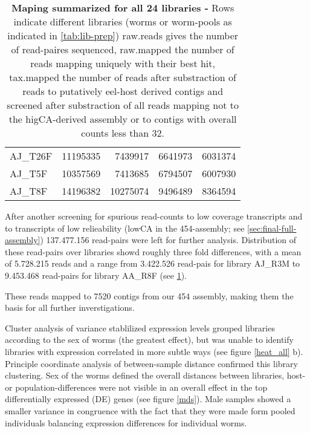 \begin{table}[h]
\begin{center}
\begin{tabular}{llrrr}
  AJ\_T26F & 11195335 & 7439917 & 6641973 & 6031374 \\ 
  AJ\_T5F & 10357569 & 7413685 & 6794507 & 6007930 \\ 
  AJ\_T8F & 14196382 & 10275074 & 9496489 & 8364594 \\ 
   \hline
\end{tabular}
\caption[mapping Summary]{\textbf{Maping summarized for all 24
    libraries -} Rows indicate different libraries (worms or
  worm-pools as indicated in \ref{tab:lib-prep}) raw.reads gives the
  number of read-paires sequenced, raw.mapped the number of reads
  mapping uniquely with their best hit, tax.mapped the number of reads
  after substraction of reads to putatively eel-host derived contigs
  and screened after substraction of all reads mapping not to the
  higCA-derived assembly or to contigs with overall counts less than
  32.}
\label{tab:read-clean}
\end{center}
\end{table}


After another screening for spurious read-counts to low coverage
transcripts and to transcripts of low relieability (lowCA in the
454-assembly; see \ref{sec:final-full-assembly}) 137.477.156
read-pairs were left for further analysis. Distribution of these
read-pairs over libraries showd roughly three fold differences, with a
mean of 5.728.215 reads and a range from 3.422.526 read-pais for
library AJ\_R3M to 9.453.468 read-pairs for library AA\_R8F (see
\ref{tab:read-clean}).


\afterpage{\clearpage}

These reads mapped to 7520 contigs from our 454 assembly, making them
the basis for all further inverstigations. 

Cluster analysis of variance stablilized expression levels grouped
libraries according to the sex of worms (the greatest effect), but was
unable to identify libraries with expression correlated in more subtle
ways (see figure \ref{heat_all} b). Principle coordinate analysis of
between-sample distance confirmed this library clustering. Sex of the
worms defined the overall distances between libraries, host- or
population-differences were not visible in an overall effect in the
top differentially expressed (DE) genes (see figure \ref{mds}). Male
samples showed a smaller variance in congruence with the fact that
they were made form pooled individuals balancing expression
differences for individual worms.

